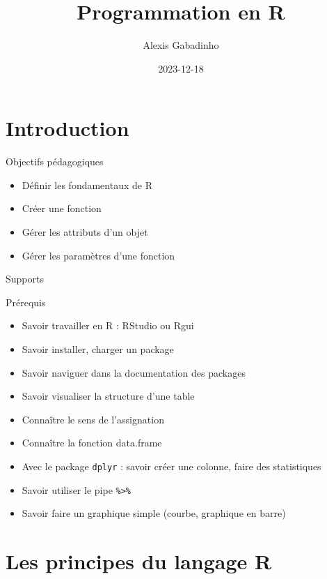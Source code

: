 \documentclass[
  ignorenonframetext,
]{beamer}
\title{Programmation en R}
\author{Alexis Gabadinho}
\date{2023-12-18}
\providecommand{\tightlist}{%
  \setlength{\itemsep}{0pt}\setlength{\parskip}{0pt}}
\begin{document}
\frame{\titlepage}

\begin{frame}[allowframebreaks]
  \tableofcontents[hideallsubsections]
\end{frame}
\hypertarget{introduction}{%
\section{Introduction}\label{introduction}}

\begin{frame}{Objectifs pédagogiques}
\protect\hypertarget{objectifs-puxe9dagogiques}{}
\begin{itemize}
\tightlist
\item
  Déﬁnir les fondamentaux de R
\item
  Créer une fonction
\item
  Gérer les attributs d'un objet
\item
  Gérer les paramètres d'une fonction
\end{itemize}
\end{frame}

\begin{frame}{Supports}
\protect\hypertarget{supports}{}
\end{frame}

\begin{frame}[fragile]{Prérequis}
\protect\hypertarget{pruxe9requis}{}
\begin{itemize}
\tightlist
\item
  Savoir travailler en R : RStudio ou Rgui
\item
  Savoir installer, charger un package
\item
  Savoir naviguer dans la documentation des packages
\item
  Savoir visualiser la structure d'une table
\item
  Connaître le sens de l'assignation
\item
  Connaître la fonction data.frame
\item
  Avec le package \texttt{dplyr} : savoir créer une colonne, faire des
  statistiques
\item
  Savoir utiliser le pipe \texttt{\%\textgreater{}\%}
\item
  Savoir faire un graphique simple (courbe, graphique en barre)
\end{itemize}
\end{frame}

\hypertarget{les-principes-du-langage-r}{%
\section{Les principes du langage R}\label{les-principes-du-langage-r}}
\end{document}
